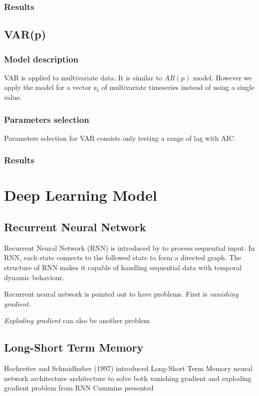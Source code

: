 \documentclass[11pt]{article}
\begin{document}
\subsubsection{Results}


\subsection{VAR(p)}
\subsubsection{Model description}
VAR is applied to multivariate data. It is similar to $AR(p)$ model. However we
apply the model for a vector ${\mathbb{x_t}}$ of multivariate timeseries instead
of using a single value.

\subsubsection{Parameters selection}
Parameters selection for VAR consists only testing a range of lag with AIC. 

\subsubsection{Results} 



\section{Deep Learning Model}
\subsection{Recurrent Neural Network}
Recurrent Neural Network (RNN) is introduced by \cite{rumelhart1988learning} to
process sequential input. In RNN, each state connects to the followed state to
form a directed graph. The structure of RNN makes it capable of handling
sequential data with temporal dynamic behaviour.

Recurrent neural network is pointed out to have problems. First is
\textit{vanishing gradient}.


\textit{Exploding gradient} can also be another problem

\subsection{Long-Short Term Memory}
Hochreiter and Schmidhuber (1997) \cite{gers1999learning} introduced Long-Short
Term Memory neural network architecture architecture to solve both vanishing
gradient and exploding gradient problem from RNN Cummins presented
\end{document}
